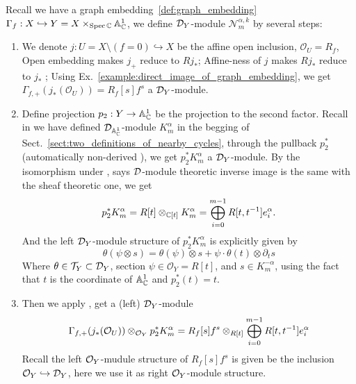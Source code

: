 \begin{definition}\label{def:N_m_alpha_k}
    Recall we have a graph embedding~\ref{def:graph_embedding} $\Gamma_f: X \hookrightarrow Y = X\times_{\operatorname{Spec} \mathbb{C}} \mathbb{A}^1_{\mathbb{C}}$,
    we define $\mathcal{D}_Y$-module $\mathcal{N}_m^{\alpha,k}$ by several steps:
    \begin{enumerate}
        \item We denote $j: U = X \setminus (f=0) \hookrightarrow X$ be the affine open inclusion, $\mathcal{O}_U = R_f$,
              Open embedding makes $j_+$ reduce to $Rj_*$;
              Affine-ness of $j$ makes $Rj_*$ reduce to $j_*$ \cite[Sect.~3.4]{hotta2008d};
              Using Ex.~\ref{example:direct_image_of_graph_embedding}, we get $\Gamma_{f,+}(j_*(\mathcal{O}_U)) = R_f[s]f^s$ a $\mathcal{D}_Y$-module.

        \item Define projection $p_2: Y \to \mathbb{A}^1_{\mathbb{C}}$ be the projection to the second factor.
              Recall in we have defined $\mathcal{D}_{\mathbb{A}^1_{\mathbb{C}}}$-module $K^\alpha_m$ in the begging of Sect.~\ref{sect:two_definitions_of_nearby_cycles},
              through the pullback $p_2^*$ (automatically non-derived \cite[Prop.~1.5.13]{hotta2008d}),
              we get $p_2^* K_m^{\alpha}$ a $\mathcal{D}_Y$-module.
              By the isomorphism under \cite[Def.~1.3.1]{hotta2008d},
              says $\mathcal{D}$-module theoretic inverse image is the same with the sheaf theoretic one,
              we get
              \[
                  p_2^* K_m^{\alpha} = R[t] \otimes_{\mathbb{C}[t]} K_m^{\alpha} = \bigoplus_{i=0}^{m-1} R[t, t^{-1}] e^\alpha_i.
              \]
              And the left $\mathcal{D}_Y$-module structure of $p_2^* K_m^{\alpha}$ is explicitly given by
              \[
                  \theta(\psi \otimes s) = \theta(\psi) \otimes s + \psi \cdot \theta(t) \otimes \partial_t s
              \]
              Where $\theta \in \mathcal{T}_Y\subset\mathcal{D}_Y$,
              section $\psi \in \mathcal{O}_Y = R[t]$, and $s \in K_m^{-\alpha}$, using the fact that $t$ is the coordinate of $\mathbb{A}^1_{\mathbb{C}}$ and $p_2^*(t) = t$.

        \item Then we apply \cite[Proposition~1.2.9.(i)]{hotta2008d},
              get a (left) $\mathcal{D}_Y$-module
              \[
                  \Gamma_{f,+}(j_*(\mathcal{O}_U)) \otimes_{\mathcal{O}_Y} p_2^* K_m^{\alpha} = R_f[s]f^s \otimes_{R[t]} \bigoplus_{i=0}^{m-1} R[t, t^{-1}] e^\alpha_i
              \]
              Recall the left $\mathcal{O}_Y$-mudule structure of $R_f[s]f^s$ is given be the inclusion $\mathcal{O}_Y \hookrightarrow \mathcal{D}_Y$,
              here we use it as right $\mathcal{O}_Y$-module structure.


\end{enumerate}
\end{definition}
